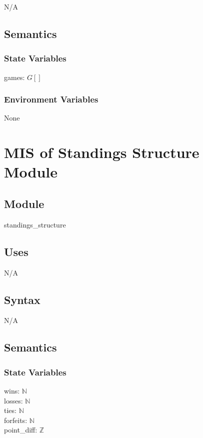 \documentclass[12pt, titlepage]{article}
\begin{document}
N/A

\subsection{Semantics}

\subsubsection{State Variables}

games: $G[]$

\subsubsection{Environment Variables}

None

\newpage

\section{MIS of Standings Structure Module} \label{mST}

\subsection{Module}

standings\_structure

\subsection{Uses}

N/A

\subsection{Syntax}

N/A

\subsection{Semantics}

\subsubsection{State Variables}

wins: $\mathbb{N}$\\
losses: $\mathbb{N}$\\ 
ties: $\mathbb{N}$\\
forfeits: $\mathbb{N}$\\
point\_diff: $\mathbb{Z}$
\end{document}

